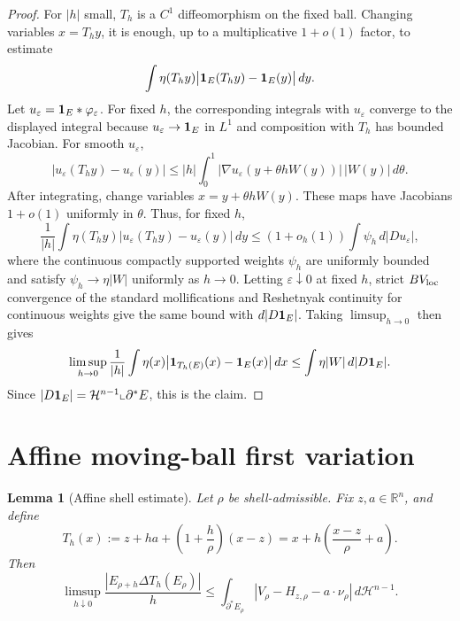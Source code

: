 \documentclass[11pt]{amsart}
\newtheorem{lemma}[theorem]{Lemma}
\theoremstyle{definition}
\newcommand{\R}{\mathbb R}
\newcommand{\eps}{\varepsilon}
\newcommand{\Hn}{\mathcal H^{n-1}}
\begin{document}
\begin{proof}
For \(|h|\) small, \(T_h\) is a \(C^1\) diffeomorphism on the fixed ball.
Changing variables \(x=T_hy\), it is enough, up to a multiplicative
\(1+o(1)\) factor, to estimate
\[
   \int \eta(T_hy)\bigl|{\bf1}_E(T_hy)-{\bf1}_E(y)\bigr|\,dy .
\]
Let \(u_\eps={\bf1}_E*\varphi_\eps\).  For fixed \(h\), the corresponding
integrals with \(u_\eps\) converge to the displayed integral because
\(u_\eps\to{\bf1}_E\) in \(L^1\) and composition with \(T_h\) has bounded
Jacobian.  For smooth \(u_\eps\),
\[
   |u_\eps(T_hy)-u_\eps(y)|
   \le |h|\int_0^1
      |\nabla u_\eps(y+\theta hW(y))|\,|W(y)|\,d\theta .
\]
After integrating, change variables \(x=y+\theta hW(y)\).  These maps have
Jacobians \(1+o(1)\) uniformly in \(\theta\).  Thus, for fixed \(h\),
\[
   \frac1{|h|}\int \eta(T_hy)|u_\eps(T_hy)-u_\eps(y)|\,dy
   \le
   (1+o_h(1))\int \psi_h\,d|Du_\eps|,
\]
where the continuous compactly supported weights \(\psi_h\) are uniformly
bounded and satisfy \(\psi_h\to\eta|W|\) uniformly as \(h\to0\).  Letting
\(\eps\downarrow0\) at fixed \(h\), strict \(BV_{\rm loc}\) convergence of
the standard mollifications and Reshetnyak continuity for continuous weights
\cite{AFP2000,Maggi2012} give the same bound with \(d|D{\bf1}_E|\).  Taking
\(\limsup_{h\to0}\) then gives
\[
   \limsup_{h\to0}\frac1{|h|}
   \int \eta(x)\bigl|{\bf1}_{T_h(E)}(x)-{\bf1}_E(x)\bigr|\,dx
   \le
   \int \eta|W|\,d|D{\bf1}_E|.
\]
Since \(|D{\bf1}_E|=\Hn\llcorner\partial^*E\), this is the claim.
\end{proof}

\section{Affine moving-ball first variation}\label{sec:shell}

\begin{lemma}[Affine shell estimate]\label{lem:shell}
Let \(\rho\) be shell-admissible.  Fix \(z,a\in\R^n\), and define
\[
   T_h(x):=z+ha+\left(1+\frac h\rho\right)(x-z)
   =x+h\left(\frac{x-z}{\rho}+a\right).
\]
Then
\begin{equation}\label{eq:shell}
   \limsup_{h\downarrow0}
   \frac{|E_{\rho+h}\Delta T_h(E_\rho)|}{h}
   \le
   \int_{\partial^*E_\rho}
      |V_\rho-H_{z,\rho}-a\cdot\nu_\rho|\,d\Hn .
\end{equation}
\end{lemma}
\end{document}
